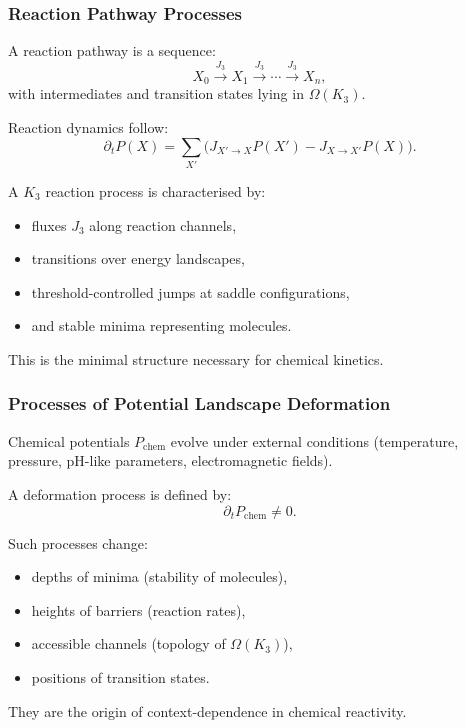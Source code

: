 \subsubsection{Reaction Pathway Processes}

A reaction pathway is a sequence:
\[
X_0 \xrightarrow{J_3} X_1 \xrightarrow{J_3} \cdots
\xrightarrow{J_3} X_n,
\]
with intermediates and transition states lying in $\Omega(K_3)$.

Reaction dynamics follow:
\[
\partial_t P(X) =
\sum_{X'} \Big(
    J_{X'\to X} P(X')
    - J_{X\to X'} P(X)
\Big).
\]

A $K_3$ reaction process is characterised by:
\begin{itemize}
    \item fluxes $J_3$ along reaction channels,
    \item transitions over energy landscapes,
    \item threshold-controlled jumps at saddle configurations,
    \item and stable minima representing molecules.
\end{itemize}

This is the minimal structure necessary for chemical kinetics.

\subsubsection{Processes of Potential Landscape Deformation}

Chemical potentials $P_\text{chem}$ evolve under external conditions
(temperature, pressure, pH-like parameters, electromagnetic fields).

A deformation process is defined by:
\[
\partial_t P_\text{chem} \neq 0.
\]

Such processes change:
\begin{itemize}
    \item depths of minima (stability of molecules),
    \item heights of barriers (reaction rates),
    \item accessible channels (topology of $\Omega(K_3)$),
    \item positions of transition states.
\end{itemize}

They are the origin of context-dependence in chemical reactivity.

